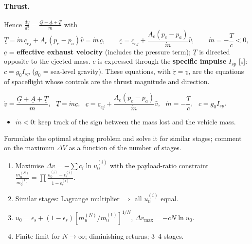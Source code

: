 \paragraph{Thrust.} Hence $\frac{d\underline v}{dt}=\frac{\underline G+\underline A+\underline T}{m}$ with
\begin{equation}
\underline T=\dot m\,\underline c_{ej}+A_e(p_e-p_a)\hat v=\dot m\,\underline c,\qquad \underline c=\underline c_{ej}+\frac{A_e(p_e-p_a)}{\dot m}\hat v,\qquad \dot m=-\frac{T}{c}<0,
\end{equation}
$\underline c$ = \textbf{effective exhaust velocity} (includes the pressure term); $\underline T$ is directed opposite to the ejected mass. $c$ is expressed through the
\textbf{specific impulse} $I_{sp}$ [s]: $c=g_0I_{sp}$ ($g_0$ = sea-level gravity). These equations, with $\dot{\underline r}=\underline v$, are the equations of spaceflight
whose controls are the thrust magnitude and direction.
\begin{keyf}
$\dot{\underline v}=\dfrac{\underline G+\underline A+\underline T}{m}$, \ $\underline T=\dot m\underline c$, \ $\underline c=\underline c_{ej}+\dfrac{A_e(p_e-p_a)}{\dot m}\hat v$, \ $\dot m=-\dfrac Tc$, \ $c=g_0I_{sp}$.
\end{keyf}
\pitfalls
\begin{itemize}
\item $\dot m<0$: keep track of the sign between the mass lost and the vehicle mass.
\end{itemize}

\begin{qbox}
Formulate the optimal staging problem and solve it for similar stages; comment on the maximum $\Delta V$ as a function of the number of stages.
\end{qbox}
\begin{outline}
\begin{enumerate}
\item Maximise $\Delta v=-\sum c_i\ln u_0^{(i)}$ with the payload-ratio constraint $\frac{m_u^{(N)}}{m_0^{(1)}}=\prod\frac{u_0^{(i)}-\epsilon_s^{(i)}}{1-\epsilon_s^{(i)}}$.
\item Similar stages: Lagrange multiplier $\Rightarrow$ all $u_0^{(i)}$ equal.
\item $u_0=\epsilon_s+(1-\epsilon_s)[m_u^{(N)}/m_0^{(1)}]^{1/N}$, $\Delta v_{\max}=-cN\ln u_0$.
\item Finite limit for $N\to\infty$; diminishing returns; 3--4 stages.
\end{enumerate}
\end{outline}
\answer
